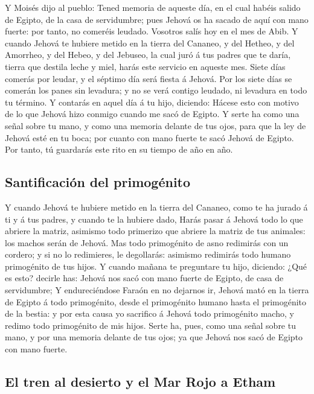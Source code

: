  Y Moisés dijo al pueblo: Tened memoria de aqueste día, en
el cual habéis salido de Egipto, de la casa de servidumbre; pues Jehová
os ha sacado de aquí con mano fuerte: por tanto, no comeréis leudado.
 Vosotros salís hoy en el mes de Abib.  Y cuando
Jehová te hubiere metido en la tierra del Cananeo, y del Hetheo, y del
Amorrheo, y del Hebeo, y del Jebuseo, la cual juró á tus padres que te
daría, tierra que destila leche y miel, harás este servicio en aqueste
mes.  Siete días comerás por leudar, y el séptimo día será
fiesta á Jehová.  Por los siete días se comerán los panes
sin levadura; y no se verá contigo leudado, ni levadura en todo tu
término.  Y contarás en aquel día á tu hijo, diciendo:
Hácese esto con motivo de lo que Jehová hizo conmigo cuando me sacó de
Egipto.  Y serte ha como una señal sobre tu mano, y como una
memoria delante de tus ojos, para que la ley de Jehová esté en tu boca;
por cuanto con mano fuerte te sacó Jehová de Egipto.  Por
tanto, tú guardarás este rito en su tiempo de año en año.

\hypertarget{santificaciuxf3n-del-primoguxe9nito}{%
\subsection{Santificación del
primogénito}\label{santificaciuxf3n-del-primoguxe9nito}}

 Y cuando Jehová te hubiere metido en la tierra del
Cananeo, como te ha jurado á ti y á tus padres, y cuando te la hubiere
dado,  Harás pasar á Jehová todo lo que abriere la matriz,
asimismo todo primerizo que abriere la matriz de tus animales: los
machos serán de Jehová.  Mas todo primogénito de asno
redimirás con un cordero; y si no lo redimieres, le degollarás: asimismo
redimirás todo humano primogénito de tus hijos.  Y cuando
mañana te preguntare tu hijo, diciendo: ¿Qué es esto? decirle has:
Jehová nos sacó con mano fuerte de Egipto, de casa de servidumbre;
 Y endureciéndose Faraón en no dejarnos ir, Jehová mató en
la tierra de Egipto á todo primogénito, desde el primogénito humano
hasta el primogénito de la bestia: y por esta causa yo sacrifico á
Jehová todo primogénito macho, y redimo todo primogénito de mis hijos.
 Serte ha, pues, como una señal sobre tu mano, y por una
memoria delante de tus ojos; ya que Jehová nos sacó de Egipto con mano
fuerte.

\hypertarget{el-tren-al-desierto-y-el-mar-rojo-a-etham}{%
\subsection{El tren al desierto y el Mar Rojo a
Etham}\label{el-tren-al-desierto-y-el-mar-rojo-a-etham}}

